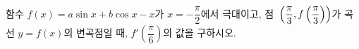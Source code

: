 함수 $f(x)=a\sin x+b\cos x-x$가 $x=-\dfrac{\pi}{2}$에서 극대이고, 점~$\left(\dfrac{\pi}{3}{,}\mkern3mu\mathopen{}f\left(\dfrac{\pi}{3}\right)\right)$가 곡선 $y=f(x)$의 변곡점일 때, $f'\left(\dfrac{\pi}{6}\right)$의 값을 구하시오. 
